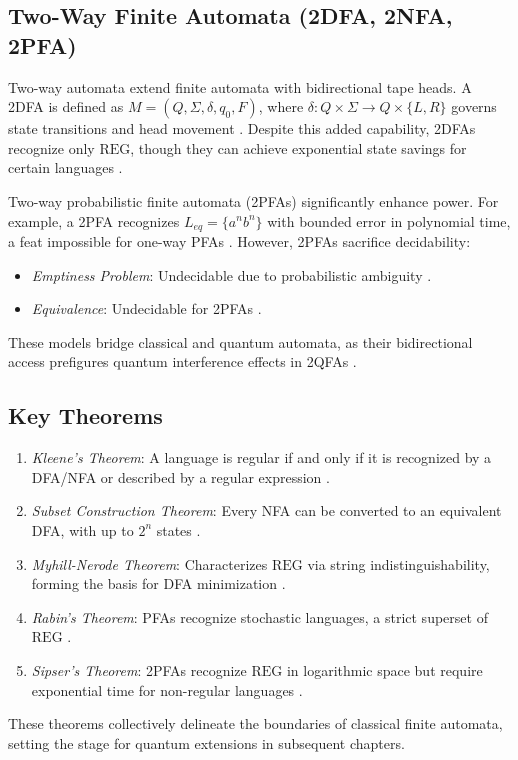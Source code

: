 \subsection{Two-Way Finite Automata (2DFA, 2NFA, 2PFA)}
\label{subsec:2dfa} 

Two-way automata extend finite automata with bidirectional tape heads. A 2DFA is defined as $M = (Q, \Sigma, \delta, q_0, F)$, where $\delta: Q \times \Sigma \to Q \times \{L, R\}$ governs state transitions and head movement \cite{kondacs1997power}. Despite this added capability, 2DFAs recognize only $\text{REG}$, though they can achieve exponential state savings for certain languages \cite{kondacs1997power}. 

Two-way probabilistic finite automata (2PFAs) significantly enhance power. For example, a 2PFA recognizes $L_{eq} = \{a^n b^n\}$ with bounded error in polynomial time, a feat impossible for one-way PFAs \cite{kondacs1997power}. However, 2PFAs sacrifice decidability:
\begin{itemize}
    \item \textit{Emptiness Problem}: Undecidable due to probabilistic ambiguity \cite{kondacs1997power}.
    \item \textit{Equivalence}: Undecidable for 2PFAs \cite{kondacs1997power}.
\end{itemize} 

These models bridge classical and quantum automata, as their bidirectional access prefigures quantum interference effects in 2QFAs \cite{ambainis2009superiority}. 

\subsection{Key Theorems}
\label{subsec:key-theorems} 

\begin{enumerate}
    \item \textit{Kleene's Theorem}: A language is regular if and only if it is recognized by a DFA/NFA or described by a regular expression \cite{hopcroft2006introduction}.
    \item \textit{Subset Construction Theorem}: Every NFA can be converted to an equivalent DFA, with up to $2^n$ states \cite{hopcroft2006introduction}.
    \item \textit{Myhill-Nerode Theorem}: Characterizes $\text{REG}$ via string indistinguishability, forming the basis for DFA minimization \cite{hopcroft2006introduction}.
    \item \textit{Rabin's Theorem}: PFAs recognize stochastic languages, a strict superset of $\text{REG}$ \cite{rabin1963probabilistic}.
    \item \textit{Sipser's Theorem}: 2PFAs recognize $\text{REG}$ in logarithmic space but require exponential time for non-regular languages \cite{sipser1980halting}.
\end{enumerate} 

These theorems collectively delineate the boundaries of classical finite automata, setting the stage for quantum extensions in subsequent chapters. 